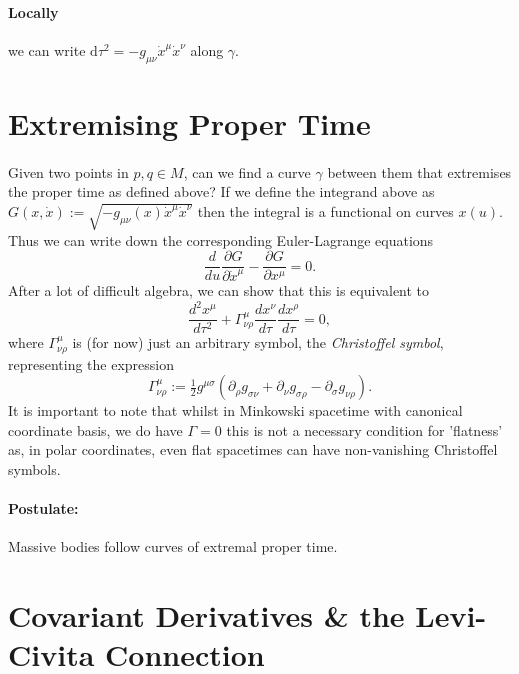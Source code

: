 \documentclass[11pt,fleqn]{report}
\begin{document}
\paragraph{Locally} we can write $\mathrm{d}\tau^2=-g_{\mu\nu}\dot{x}^\mu\dot{x}^\nu$ along $\gamma$.

\section{Extremising Proper Time}

\paragraph{} Given two points in $p,q \in M$, can we find a curve $\gamma$ between them that extremises the proper time as defined above? If we define the integrand above as $G(x,\dot{x}):=\sqrt{-g_{\mu\nu}(x)\dot{x}^\mu\dot{x}^\nu}$ then the integral is a functional on curves $x(u)$. Thus we can write down the corresponding Euler-Lagrange equations \begin{equation}
\frac{d}{du}\frac{\partial G}{\partial \dot{x}^\mu} - \frac{\partial G}{\partial x^\mu} = 0.
\end{equation}
After a lot of difficult algebra, we can show that this is equivalent to \begin{equation}\label{Geodesic}
\frac{d^2x^\mu}{d\tau^2} +\Gamma^\mu_{\nu\rho}\frac{dx^\nu}{d\tau}\frac{dx^\rho}{d\tau} = 0,
\end{equation}
where $\Gamma^\mu_{\nu\rho}$ is (for now) just an arbitrary symbol, the \textit{Christoffel symbol}, representing the expression\begin{equation}
\Gamma^\mu_{\nu\rho} := \tfrac{1}{2}g^{\mu\sigma}\left(\partial_\rho g_{\sigma\nu} + \partial_\nu g_{\sigma\rho} - \partial_\sigma g_{\nu\rho}\right).
\end{equation}
It is important to note that whilst in Minkowski spacetime with canonical coordinate basis, we do have $\Gamma=0$ this is not a necessary condition for 'flatness' as, in polar coordinates, even flat spacetimes can have non-vanishing Christoffel symbols.

\paragraph{Postulate:} Massive bodies follow curves of extremal proper time.

\section{Covariant Derivatives \& the Levi-Civita Connection}
\end{document}
